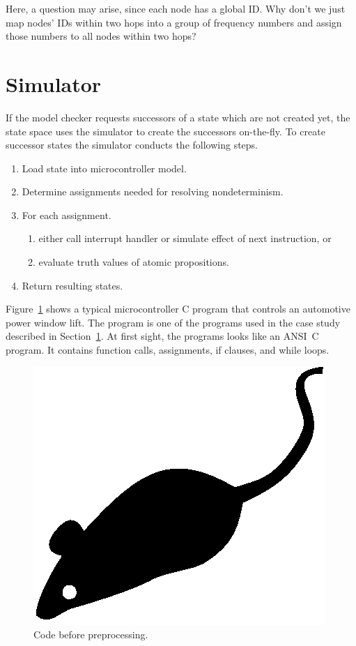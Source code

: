 \documentclass[prodmode,acmtecs]{acmsmall}
\begin{document}
Here, a question may arise, since each node has a global ID. Why
don't we just map nodes' IDs within two hops into a group of
frequency numbers and assign those numbers to all nodes within two
hops?

\section{Simulator}
\label{sec:sim}

If the model checker requests successors of a state which are not
created yet, the state space uses the simulator to create the
successors on-the-fly. To create successor states the simulator
conducts the following steps.
\begin{enumerate}
\item Load state into microcontroller model.
\item Determine assignments needed for resolving nondeterminism.
\item For each assignment.
      \begin{enumerate}
      \item either call interrupt handler or simulate effect of next instruction, or
      \item evaluate truth values of atomic propositions.
      \end{enumerate}
\item Return resulting states.
\end{enumerate}
Figure~\ref{fig:one} shows a typical microcontroller C program that
controls an automotive power window lift. The program is one of the
programs used in the case study described in Section~\ref{sec:sim}.
At first sight, the programs looks like an ANSI~C program. It
contains function calls, assignments, if clauses, and while loops.
\begin{figure}
\centerline{\includegraphics{acmsmall-mouse}}
\caption{Code before preprocessing.}
\label{fig:one}
\end{figure}
\end{document}
